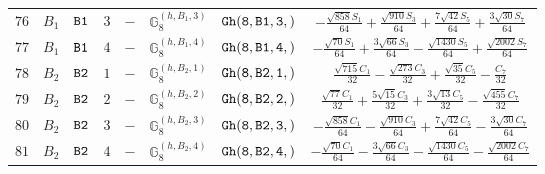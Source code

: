 \documentclass[fleqn,8pt]{jsarticle}
\begin{document}
\begin{table}[ht!]
\begin{center}
\begin{tabular}{cccccccc}
$ 76 $ & $ B_{1} $ & $ {\tt B1} $ & $ 3 $ & $ - $ & $ \mathbb{G}_{8}^{(h,B_{1},3)} $ & $ {\tt Gh(8,B1,3,)} $ & $ - \frac{\sqrt{858} S_{1}}{64} + \frac{\sqrt{910} S_{3}}{64} + \frac{7 \sqrt{42} S_{5}}{64} + \frac{3 \sqrt{30} S_{7}}{64} $ \\
$ 77 $ & $ B_{1} $ & $ {\tt B1} $ & $ 4 $ & $ - $ & $ \mathbb{G}_{8}^{(h,B_{1},4)} $ & $ {\tt Gh(8,B1,4,)} $ & $ - \frac{\sqrt{70} S_{1}}{64} + \frac{3 \sqrt{66} S_{3}}{64} - \frac{\sqrt{1430} S_{5}}{64} + \frac{\sqrt{2002} S_{7}}{64} $ \\
$ 78 $ & $ B_{2} $ & $ {\tt B2} $ & $ 1 $ & $ - $ & $ \mathbb{G}_{8}^{(h,B_{2},1)} $ & $ {\tt Gh(8,B2,1,)} $ & $ \frac{\sqrt{715} C_{1}}{32} - \frac{\sqrt{273} C_{3}}{32} + \frac{\sqrt{35} C_{5}}{32} - \frac{C_{7}}{32} $ \\
$ 79 $ & $ B_{2} $ & $ {\tt B2} $ & $ 2 $ & $ - $ & $ \mathbb{G}_{8}^{(h,B_{2},2)} $ & $ {\tt Gh(8,B2,2,)} $ & $ \frac{\sqrt{77} C_{1}}{32} + \frac{5 \sqrt{15} C_{3}}{32} + \frac{3 \sqrt{13} C_{5}}{32} - \frac{\sqrt{455} C_{7}}{32} $ \\
$ 80 $ & $ B_{2} $ & $ {\tt B2} $ & $ 3 $ & $ - $ & $ \mathbb{G}_{8}^{(h,B_{2},3)} $ & $ {\tt Gh(8,B2,3,)} $ & $ - \frac{\sqrt{858} C_{1}}{64} - \frac{\sqrt{910} C_{3}}{64} + \frac{7 \sqrt{42} C_{5}}{64} - \frac{3 \sqrt{30} C_{7}}{64} $ \\
$ 81 $ & $ B_{2} $ & $ {\tt B2} $ & $ 4 $ & $ - $ & $ \mathbb{G}_{8}^{(h,B_{2},4)} $ & $ {\tt Gh(8,B2,4,)} $ & $ - \frac{\sqrt{70} C_{1}}{64} - \frac{3 \sqrt{66} C_{3}}{64} - \frac{\sqrt{1430} C_{5}}{64} - \frac{\sqrt{2002} C_{7}}{64} $ \\
 \hline \hline
\end{tabular}
\end{center}
\end{table}
\end{document}
